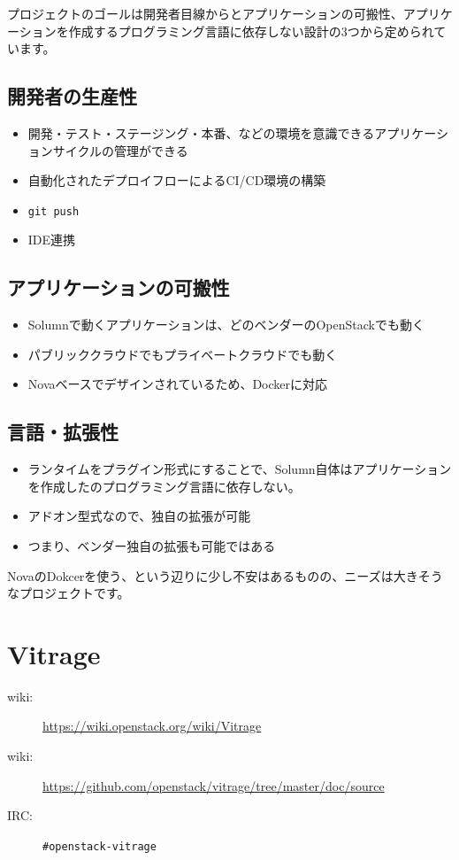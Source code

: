プロジェクトのゴールは開発者目線からとアプリケーションの可搬性、アプリケーションを作成するプログラミング言語に依存しない設計の3つから定められています。

\subsection*{開発者の生産性}
\begin{itemize}
	\item 開発・テスト・ステージング・本番、などの環境を意識できるアプリケーションサイクルの管理ができる
	\item 自動化されたデプロイフローによるCI/CD環境の構築
	\item \verb|git push|
	\item IDE連携
\end{itemize}

\subsection*{アプリケーションの可搬性}
\begin{itemize}
	\item Solumnで動くアプリケーションは、どのベンダーのOpenStackでも動く
	\item パブリッククラウドでもプライベートクラウドでも動く
	\item Novaベースでデザインされているため、Dockerに対応
\end{itemize}

\subsection*{言語・拡張性}
\begin{itemize}
	\item ランタイムをプラグイン形式にすることで、Solumn自体はアプリケーションを作成したのプログラミング言語に依存しない。
	\item アドオン型式なので、独自の拡張が可能
	\item つまり、ベンダー独自の拡張も可能ではある
\end{itemize}

NovaのDokcerを使う、という辺りに少し不安はあるものの、ニーズは大きそうなプロジェクトです。

\section{Vitrage}

\begin{description}
	\item[wiki:] \url{https://wiki.openstack.org/wiki/Vitrage}
	\item[wiki:] \url{https://github.com/openstack/vitrage/tree/master/doc/source}
	\item[IRC:] \verb|#openstack-vitrage|
\end{description}

